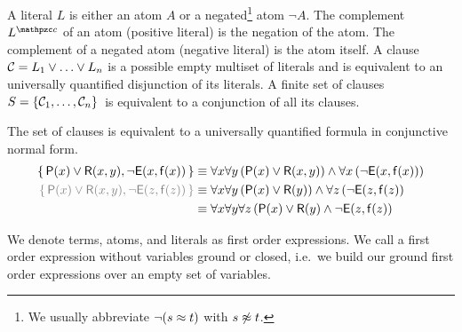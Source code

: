 
\begin{definition}\label{def:literals}
A {\myem literal} $L$ is either an atom $A$ or a negated\footnote{
We usually abbreviate $\lnot(s\approx t)$ with $s\not\approx t$.
} 
atom $\lnot A$.
%
The {\myem complement} $L^\mcc$ of an atom (positive literal) is the negation of the atom.
The complement of a negated atom (negative literal) is the atom itself. 
%
A {\myem clause}\ \ ${\mathcal C} = L_1\lor\ldots\lor L_n$  is a possible empty multiset of literals 
and is equivalent to an universally quantified disjunction of its literals.
%
A finite {\myem set of clauses} $S=\{ {\mathcal C}_1,\ldots,{\mathcal C}_n \}$ is equivalent to a conjunction of all its clauses.
%
\end{definition}

\begin{example}The set of clauses is equivalent to a universally quantified formula in conjunctive normal form.
	\begin{align*}
		\{\, \mP(x)\lor\mR(x,y), \lnot \mE(x,\mf(x)) \, \}
		&\equiv
		\forall x \forall y\, (\mP(x)\lor\mR(x,y))
		\land
		\forall x\, (\lnot \mE(x,\mf(x))) 
		\\
		{\colG
			\{\, \mP(x)\lor\mR(x,y), \lnot \mE(z,\mf(z)) \, \}}
		&\equiv
		\forall x \forall y\, (\mP(x)\lor\mR(y))
		\land
		\forall z\,(\lnot \mE(z,\mf(z)) 
		\\
		&\equiv
		\forall x \forall y\forall z\, 
		(\mP(x)\lor\mR(y)\land \lnot \mE(z,\mf(z))
	\end{align*}
\end{example}

\begin{definition}
	We denote
	terms, atoms, and literals as first order expressions.
	We call a first order expression without variables {\myem ground} or {\myem closed}, 
	i.e.~we build our ground first order expressions over an empty set of variables.
\end{definition}

